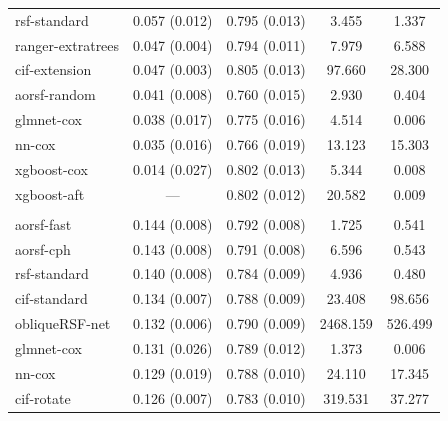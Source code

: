 \documentclass[12pt]{article}\usepackage[]{graphicx}\usepackage[]{xcolor}
\newenvironment{knitrout}{}{} %
\begin{document}
\begin{knitrout}
\begin{longtable}[t]{lcccc}
\hspace{1em}rsf-standard & 0.057 (0.012) & 0.795 (0.013) & 3.455 & 1.337\\
\hspace{1em}ranger-extratrees & 0.047 (0.004) & 0.794 (0.011) & 7.979 & 6.588\\
\hspace{1em}cif-extension & 0.047 (0.003) & 0.805 (0.013) & 97.660 & 28.300\\
\hspace{1em}aorsf-random & 0.041 (0.008) & 0.760 (0.015) & 2.930 & 0.404\\
\hspace{1em}glmnet-cox & 0.038 (0.017) & 0.775 (0.016) & 4.514 & 0.006\\
\hspace{1em}nn-cox & 0.035 (0.016) & 0.766 (0.019) & 13.123 & 15.303\\
\hspace{1em}xgboost-cox & 0.014 (0.027) & 0.802 (0.013) & 5.344 & 0.008\\
\hspace{1em}xgboost-aft & --- & 0.802 (0.012) & 20.582 & 0.009\\
\addlinespace[0.3em]
\multicolumn{5}{l}{\textit{\textbf{MESA; death, n = 6793, p = 48}}}\\
\hline
\hspace{1em}aorsf-fast & 0.144 (0.008) & 0.792 (0.008) & 1.725 & 0.541\\
\hspace{1em}aorsf-cph & 0.143 (0.008) & 0.791 (0.008) & 6.596 & 0.543\\
\hspace{1em}rsf-standard & 0.140 (0.008) & 0.784 (0.009) & 4.936 & 0.480\\
\hspace{1em}cif-standard & 0.134 (0.007) & 0.788 (0.009) & 23.408 & 98.656\\
\hspace{1em}obliqueRSF-net & 0.132 (0.006) & 0.790 (0.009) & 2468.159 & 526.499\\
\hspace{1em}glmnet-cox & 0.131 (0.026) & 0.789 (0.012) & 1.373 & 0.006\\
\hspace{1em}nn-cox & 0.129 (0.019) & 0.788 (0.010) & 24.110 & 17.345\\
\hspace{1em}cif-rotate & 0.126 (0.007) & 0.783 (0.010) & 319.531 & 37.277\\

\end{longtable}
\end{knitrout}
\end{document}
